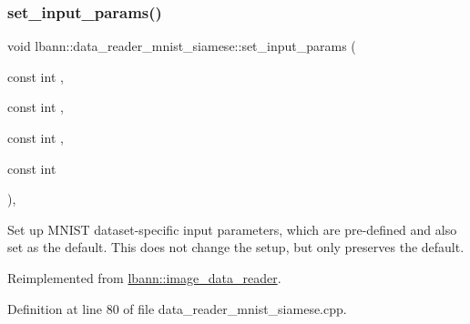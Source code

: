 \mbox{\label{classlbann_1_1data__reader__mnist__siamese_abe572754f0b1415407c1b698b0f83656}} 
\subsubsection{\texorpdfstring{set\+\_\+input\+\_\+params()}{set\_input\_params()}}
{\footnotesize\ttfamily void lbann\+::data\+\_\+reader\+\_\+mnist\+\_\+siamese\+::set\+\_\+input\+\_\+params (\begin{DoxyParamCaption}\item[{const int}]{,  }\item[{const int}]{,  }\item[{const int}]{,  }\item[{const int}]{ }\end{DoxyParamCaption})\hspace{0.3cm}{\ttfamily [override]}, {\ttfamily [virtual]}}

Set up M\+N\+I\+ST dataset-\/specific input parameters, which are pre-\/defined and also set as the default. This does not change the setup, but only preserves the default. 

Reimplemented from \hyperlink{classlbann_1_1image__data__reader_a6ed9b8b12ad3ffa93ad458d872f8c044}{lbann\+::image\+\_\+data\+\_\+reader}.



Definition at line 80 of file data\+\_\+reader\+\_\+mnist\+\_\+siamese.\+cpp.


